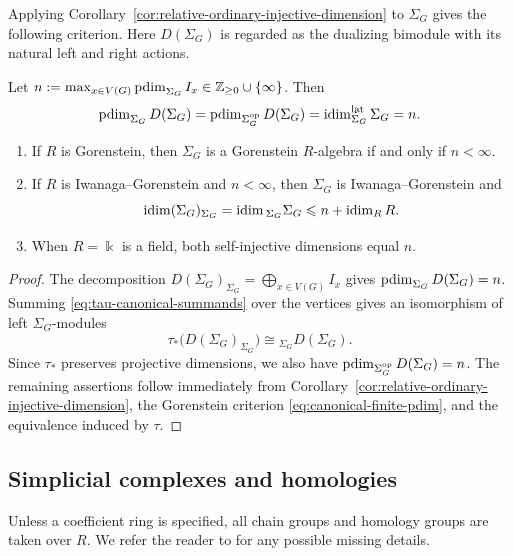 \documentclass[a4paper,leqno]{amsart}
\begin{document}
Applying Corollary~\ref{cor:relative-ordinary-injective-dimension} to $\Sigma_G$ gives the following criterion. Here $D(\Sigma_G)$ is regarded as the dualizing bimodule with its natural left and right actions.

\begin{cor}\label{cor:distance-gorenstein-criterion}
Let $n:=\max_{x\in V(G)}\operatorname{pdim}_{\Sigma_G}I_x
 \in\mathbb Z_{\geq0}\cup\{\infty\}$. Then
\begin{equation}
 \operatorname{pdim}_{\Sigma_G}D(\Sigma_G)
 =\operatorname{pdim}_{\Sigma_G^{\operatorname{op}}}D(\Sigma_G)
 =\operatorname{idim}^{\operatorname{lat}}_{\Sigma_G}\Sigma_G
 =n.
 \label{eq:distance-canonical-dimensions}
\end{equation}
\begin{enumerate}
    \item If $R$ is Gorenstein, then $\Sigma_G$ is a Gorenstein
$R$-algebra if and only if $n<\infty$.
\item If $R$ is Iwanaga--Gorenstein and $n<\infty$, then $\Sigma_G$ is Iwanaga--Gorenstein and
\[
 \operatorname{idim}(\Sigma_G)_{\Sigma_G}
 =\operatorname{idim}{}_{\Sigma_G}\Sigma_G
 \leqslant n+\operatorname{idim}_R R.
\]
\item When $R=\Bbbk$ is a field, both self-injective dimensions equal $n$.
\end{enumerate}
\end{cor}

\begin{proof}
The decomposition $D(\Sigma_G)_{\Sigma_G}
 =\bigoplus_{x\in V(G)}I_x$ gives $\operatorname{pdim}_{\Sigma_G}D(\Sigma_G)=n$. Summing \eqref{eq:tau-canonical-summands} over the vertices gives an isomorphism of left $\Sigma_G$-modules
\[
 \tau_*\bigl(D(\Sigma_G)_{\Sigma_G}\bigr)
 \cong{}_{\Sigma_G}D(\Sigma_G).
\]
Since $\tau_*$ preserves projective dimensions, we also have
$\operatorname{pdim}_{\Sigma_G^{\operatorname{op}}}D(\Sigma_G)=n$. 
The remaining assertions follow immediately from Corollary~\ref{cor:relative-ordinary-injective-dimension}, the Gorenstein criterion \eqref{eq:canonical-finite-pdim}, and the equivalence induced by $\tau$.
\end{proof}




\subsection{Simplicial complexes and homologies}
\label{subsec:simplicial-topology}

Unless a coefficient ring is specified, all chain groups and homology groups are taken over $R$.  We refer the reader to \cite{Mun84} for any possible missing details.
\end{document}

